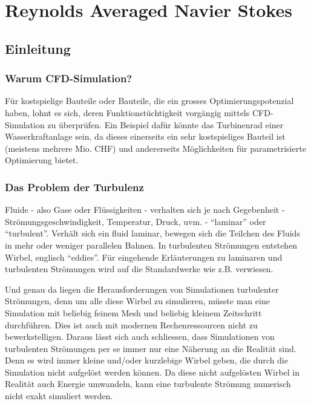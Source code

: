 %
%
%
%
\chapter{Reynolds Averaged Navier Stokes \label{chapter:reynolds}}
\begin{refsection}

\section{Einleitung}

\subsection{Warum CFD-Simulation?}

Für kostspielige Bauteile oder Bauteile, die ein grosses Optimierungspotenzial haben,
lohnt es sich, deren Funktionstüchtigkeit vorgängig mittels CFD-Simulation zu überprüfen.
Ein Beispiel dafür könnte das Turbinenrad einer Wasserkraftanlage sein,
da dieses einerseits ein sehr kostspieliges Bauteil ist (meistens mehrere Mio. CHF)
und andererseits Möglichkeiten für parametrisierte Optimierung bietet.

\subsection{Das Problem der Turbulenz}

Fluide - also Gase oder Flüssigkeiten - verhalten sich je nach Gegebenheit - Strömungsgeschwindigkeit, Temperatur, Druck, uvm. -
``laminar'' oder ``turbulent''. Verhält sich ein fluid laminar, bewegen sich die Teilchen des Fluids in mehr oder weniger
parallelen Bahnen. In turbulenten Strömungen entstehen Wirbel, englisch ``eddies''. Für eingehende Erläuterungen zu laminaren
und turbulenten Strömungen wird auf die Standardwerke wie z.B. \cite{reynolds:oertel} verwiesen.

Und genau da liegen die Herausforderungen von Simulationen turbulenter Strömungen,
denn um alle diese Wirbel zu simulieren, müsste man eine Simulation mit beliebig feinem Mesh und beliebig kleinem Zeitschritt durchführen.
Dies ist auch mit modernen Rechenressourcen nicht zu bewerkstelligen.
Daraus lässt sich auch schliessen, dass Simulationen von turbulenten Strömungen per se immer nur eine Näherung an die Realität sind.
Denn es wird immer kleine und/oder kurzlebige Wirbel geben, die durch die Simulation nicht aufgelöst werden können.
Da diese nicht aufgelösten Wirbel in Realität auch Energie umwandeln, kann eine turbulente Strömung numerisch nicht exakt simuliert werden.



\end{refsection}
